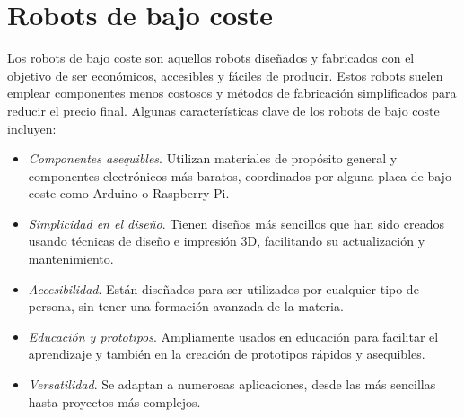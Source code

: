 \setcounter{footnote}{12} %
\setcounter{footnote}{13} %
\setcounter{footnote}{14} %
\setcounter{footnote}{15} %


\section{Robots de bajo coste}
\label{sec:robotbajocoste}

Los robots de bajo coste son aquellos robots diseñados y fabricados con el objetivo de ser económicos, accesibles y fáciles de producir. Estos robots suelen emplear componentes menos costosos y métodos de fabricación simplificados para reducir el precio final. Algunas características clave de los robots de bajo coste incluyen:

\begin{itemize}
	\item \textit{Componentes asequibles}. Utilizan materiales de propósito general y componentes electrónicos más baratos, coordinados por alguna placa de bajo coste como Arduino o Raspberry Pi.
	\item \textit{Simplicidad en el diseño}. Tienen diseños más sencillos que han sido creados usando técnicas de diseño e impresión 3D, facilitando su actualización y mantenimiento.
	\item \textit{Accesibilidad}. Están diseñados para ser utilizados por cualquier tipo de persona, sin tener una formación avanzada de la materia.
	\item \textit{Educación y prototipos}. Ampliamente usados en educación para facilitar el aprendizaje y también en la creación de prototipos rápidos y asequibles.
	\item \textit{Versatilidad}. Se adaptan a numerosas aplicaciones, desde las más sencillas hasta proyectos más complejos.
	
\end{itemize}\


